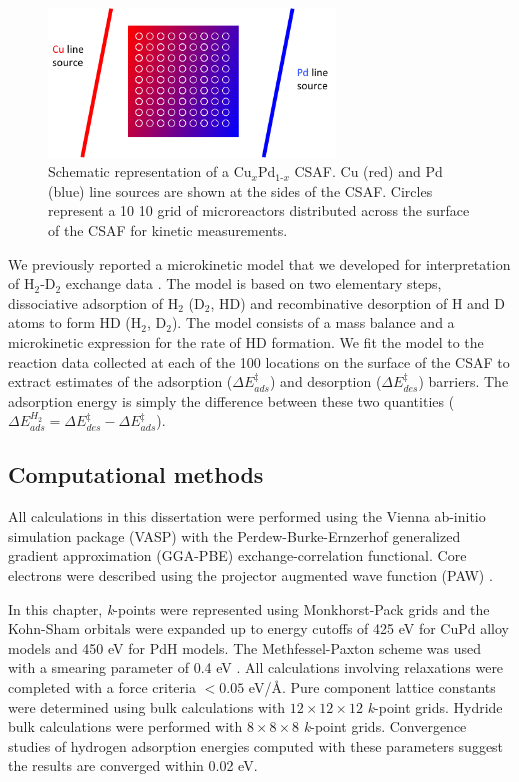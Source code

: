 \documentclass[12pt]{cmuthesis}
\begin{document}
\begin{figure}[h]
\centering
\includegraphics[width=3in]{./images/experiment.png}
\caption{Schematic representation of a Cu\(_x\)Pd\(_{\text{1-}x}\) CSAF. Cu (red) and Pd (blue) line sources are shown at the sides of the CSAF. Circles represent a 10 \texttimes{} 10 grid of microreactors distributed across the surface of the CSAF for kinetic measurements. \label{fig-experiment}}
\end{figure}

We previously reported a microkinetic model that we developed for interpretation of H\(_{\text{2}}\)-D\(_{\text{2}}\) exchange data \cite{obrien-2011-kinet-h}. The model is based on two elementary steps, dissociative adsorption of H\(_{\text{2}}\) (D\(_{\text{2}}\), HD) and recombinative desorption of H and D atoms to form HD (H\(_{\text{2}}\), D\(_{\text{2}}\)).  The model consists of a mass balance and a microkinetic expression for the rate of HD formation. We fit the model to the reaction data collected at each of the 100 locations on the surface of the CSAF to extract estimates of the adsorption (\(\Delta E^{\ddagger}_{ads}\)) and desorption (\(\Delta E^{\ddagger}_{des}\)) barriers. The adsorption energy is simply the difference between these two quantities (\(\Delta E^{H_{2}}_{ads} = \Delta E^{\ddagger}_{des} - \Delta E^{\ddagger}_{ads}\)).

\subsection{Computational methods}
\label{sec:org7f6cd8e}
All calculations in this dissertation were performed using the Vienna ab-initio simulation package (VASP) \cite{kresse-1996-effic,kresse-1996-effic2} with the Perdew-Burke-Ernzerhof generalized gradient approximation (GGA-PBE) \cite{perdew-1996-gener-gradien,perdew-1997-gener-gradien} exchange-correlation functional. Core electrons were described using the projector augmented wave function (PAW) \cite{blochl-1994-projec-augmen,kresse-1999-from-ultras}.

In this chapter, \emph{k}-points were represented using Monkhorst-Pack grids \cite{monkhorst-1976-special-point} and the Kohn-Sham orbitals were expanded up to energy cutoffs of 425 eV for CuPd alloy models and 450 eV for PdH models. The Methfessel-Paxton scheme was used with a smearing parameter of 0.4 eV \cite{methfessel-1989-high-precis}. All calculations involving relaxations were completed with a force criteria \(< 0.05\) eV/\AA{}. Pure component lattice constants were determined using bulk calculations with \(12 \times 12 \times 12\) \emph{k}-point grids. Hydride bulk calculations were performed with \(8 \times 8 \times 8\) \emph{k}-point grids. Convergence studies of hydrogen adsorption energies computed with these parameters suggest the results are converged within \textpm{} 0.02 eV.
\end{document}
